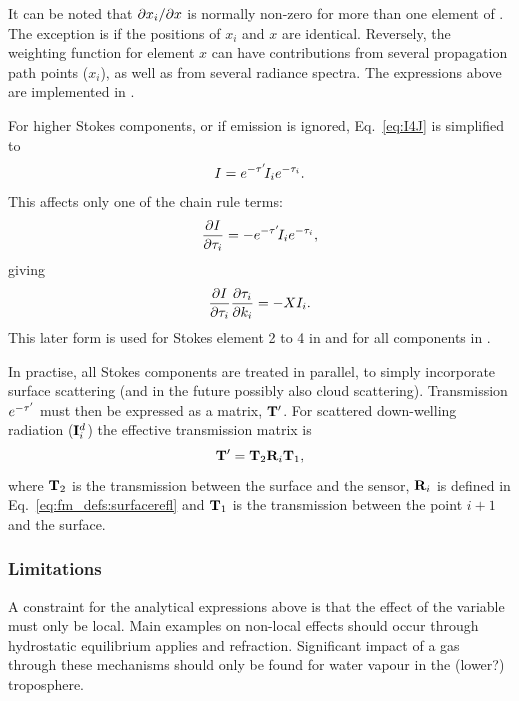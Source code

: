It can be noted that $\partial x_i/\partial x$ is normally non-zero for more than
one element of \SttVct. The exception is if the positions of $x_i$ and $x$ are
identical. Reversely, the weighting function for element $x$ can have
contributions from several propagation path points ($x_i$), as well as from
several radiance spectra.
The expressions above are implemented in .

For higher Stokes components, or if emission is ignored, Eq.~\ref{eq:I4J} is
simplified to
\begin{equation}
  \label{eq:Q4J}
  I = e^{-\tau'}\!I_ie^{-\tau_{i}}.
\end{equation}
This affects only one of the chain rule terms:
\begin{equation}
  \frac{\partial I}{\partial \tau_{i}} 
      = -e^{-\tau'}\!I_i e^{-\tau_{i}},
\end{equation}
giving
\begin{equation}
  \frac{\partial I}{\partial \tau_{i}}\frac{\partial \tau_{i}}{\partial k_i} =
  -X I_i.
\end{equation}
This later form is used for Stokes element 2 to 4 in
 and for all components in
.

In practise, all Stokes components are treated in parallel, to simply
incorporate surface scattering (and in the future possibly also cloud
scattering). Transmission $e^{-\tau'}$ must then be expressed as a matrix,
$\mathbf{T}'$. For scattered down-welling radiation (${\bf I}^d_i$) the
effective transmission matrix is
\begin{equation}
  \mathbf{T}' = \mathbf{T}_2\mathbf{R}_i\mathbf{T}_1,
\end{equation}
where $\mathbf{T}_2$ is the transmission between the surface and the sensor,
$\mathbf{R}_i$ is defined in Eq.~\ref{eq:fm_defs:surfacerefl} and
$\mathbf{T}_1$ is the transmission between the point $i+1$ and the surface.


\subsubsection{Limitations}
%
A constraint for the analytical expressions above is that the effect of the
variable must only be local. Main examples on non-local effects should occur
through hydrostatic equilibrium applies and refraction. Significant impact of a
gas through these mechanisms should only be found for water vapour in the
(lower?) troposphere.






